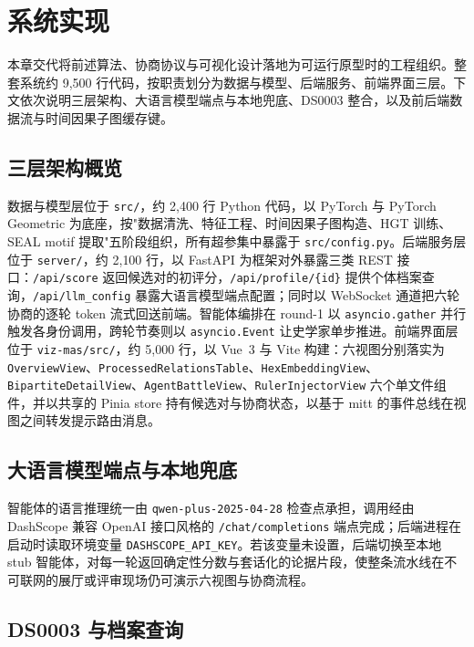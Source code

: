 \chapter{系统实现}\label{chap:impl}

本章交代将前述算法、协商协议与可视化设计落地为可运行原型时的工程组织。整套系统约 9{,}500 行代码，按职责划分为数据与模型、后端服务、前端界面三层。下文依次说明三层架构、大语言模型端点与本地兜底、DS0003 整合，以及前后端数据流与时间因果子图缓存键。

\section{三层架构概览}\label{sec:impl-arch}

数据与模型层位于 \texttt{src/}，约 2{,}400 行 Python 代码，以 PyTorch\citep{paszke2019pytorch} 与 PyTorch Geometric\citep{fey2019pyg} 为底座，按"数据清洗、特征工程、时间因果子图构造、HGT 训练、SEAL motif 提取"五阶段组织，所有超参集中暴露于 \texttt{src/config.py}。后端服务层位于 \texttt{server/}，约 2{,}100 行，以 FastAPI 为框架对外暴露三类 REST 接口：\texttt{/api/score} 返回候选对的初评分，\texttt{/api/profile/\{id\}} 提供个体档案查询，\texttt{/api/llm\_config} 暴露大语言模型端点配置；同时以 WebSocket 通道把六轮协商的逐轮 token 流式回送前端。智能体编排在 round-1 以 \texttt{asyncio.gather} 并行触发各身份调用，跨轮节奏则以 \texttt{asyncio.Event} 让史学家单步推进。前端界面层位于 \texttt{viz-mas/src/}，约 5{,}000 行，以 Vue~3 与 Vite 构建：六视图分别落实为 \texttt{OverviewView}、\texttt{ProcessedRelationsTable}、\texttt{HexEmbeddingView}、\texttt{BipartiteDetailView}、\texttt{AgentBattleView}、\texttt{RulerInjectorView} 六个单文件组件，并以共享的 Pinia store 持有候选对与协商状态，以基于 mitt 的事件总线在视图之间转发提示路由消息。

\section{大语言模型端点与本地兜底}\label{sec:impl-llm}

智能体的语言推理统一由 \texttt{qwen-plus-2025-04-28} 检查点承担，调用经由 DashScope 兼容 OpenAI 接口风格的 \texttt{/chat/completions} 端点完成；后端进程在启动时读取环境变量 \texttt{DASHSCOPE\_API\_KEY}。若该变量未设置，后端切换至本地 stub 智能体，对每一轮返回确定性分数与套话化的论据片段，使整条流水线在不可联网的展厅或评审现场仍可演示六视图与协商流程。

\section{DS0003 与档案查询}\label{sec:impl-ds0003}

